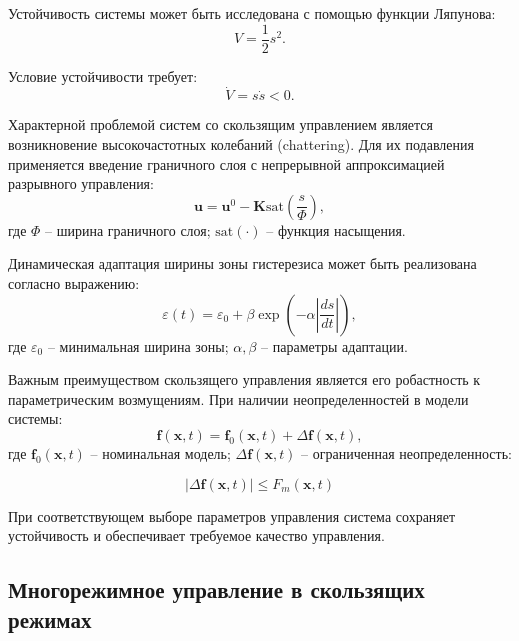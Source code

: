Устойчивость системы может быть исследована с помощью функции Ляпунова:
\begin{equation*}
	V = \frac{1}{2}s^2.
\end{equation*}

Условие устойчивости требует:
\begin{equation*}
	\dot{V} = s\dot{s} < 0.
\end{equation*}

Характерной проблемой систем со скользящим управлением является возникновение высокочастотных колебаний
(chattering). Для их подавления применяется введение граничного слоя с непрерывной аппроксимацией разрывного управления:
\begin{equation*}
	\mathbf{u} = \mathbf{u}^0 - \mathbf{K}\text{sat}\left(\frac{s}{\Phi}\right),
\end{equation*}
где $\Phi$ -- ширина граничного слоя; $\text{sat}(\cdot)$ -- функция насыщения.

Динамическая адаптация ширины зоны гистерезиса может быть реализована согласно выражению:
\begin{equation*}
	\varepsilon(t) = \varepsilon_0 + \beta\exp\left(-\alpha\left|\frac{ds}{dt}\right|\right),
\end{equation*}
где $\varepsilon_0$ -- минимальная ширина зоны; $\alpha, \beta$ -- параметры адаптации.

Важным преимуществом скользящего управления является его робастность к
параметрическим возмущениям. При наличии неопределенностей в модели системы:
\begin{equation*}
	\mathbf{f}(\mathbf{x}, t) = \mathbf{f}_0(\mathbf{x}, t) + \Delta\mathbf{f}(\mathbf{x}, t),
\end{equation*}
где $\mathbf{f}_0(\mathbf{x}, t)$ -- номинальная модель;
$\Delta\mathbf{f}(\mathbf{x}, t)$ -- ограниченная неопределенность:

\begin{equation*}
	|\Delta\mathbf{f}(\mathbf{x}, t)| \leq F_m(\mathbf{x}, t)
\end{equation*}

При соответствующем выборе параметров управления система сохраняет устойчивость и обеспечивает требуемое качество управления.

\subsection{Многорежимное управление в скользящих режимах}\label{subsec:ch3/sec3/sub2}


